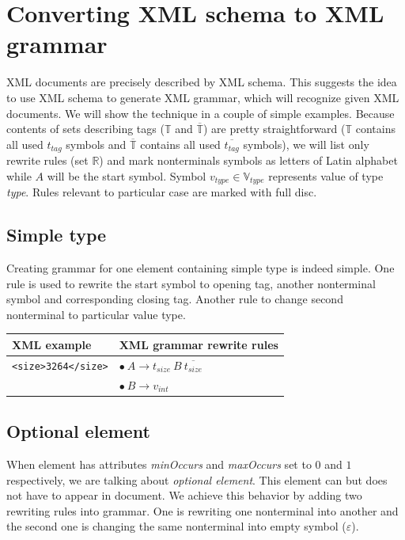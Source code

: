 \documentclass[12pt,notitlepage]{report}
\begin{document}
\section{Converting XML schema to XML grammar}
\label{convert-xml-grammar}

XML documents are precisely described by XML schema. This suggests the idea to use XML schema to generate XML grammar, which will recognize given XML documents. We will show the technique in a couple of simple examples. Because contents of sets describing tags ($\mathbb{T}$ and $\overline{\mathbb{T}}$) are pretty straightforward ($\mathbb{T}$ contains all used $t_{tag}$ symbols and $\overline{\mathbb{T}}$ contains all used $\overline{t_{tag}}$ symbols), we will list only rewrite rules (set $\mathbb{R}$) and mark nonterminals symbols as letters of Latin alphabet while $A$ will be the start symbol. Symbol $v_{type} \in \mathbb{V}_{type}$ represents value of type \textit{type}. Rules relevant to particular case are marked with full disc.

\subsection{Simple type}

Creating grammar for one element containing simple type is indeed simple. One rule is used to rewrite the start symbol to opening tag, another nonterminal symbol and corresponding closing tag. Another rule to change second nonterminal to particular value type.

\begin{center}
\setlength{\tabcolsep}{0.5cm}
\renewcommand{\arraystretch}{1.3}
\begin{tabular}{|l|l|}
\hline
XML example & XML grammar rewrite rules \\ \hline
\texttt{<size>3264</size>} & $\bullet~A \rightarrow t_{size}~B~\overline{t_{size}}$ \\
 & $\bullet~B \rightarrow v_{int}$ \\ \hline
\end{tabular}
\end{center}

\subsection{Optional element}

When element has attributes \textit{minOccurs} and \textit{maxOccurs} set to $0$ and $1$ respectively, we are talking about \textit{optional element}. This element can but does not have to appear in document. We achieve this behavior by adding two rewriting rules into grammar. One is rewriting one nonterminal into another and the second one is changing the same nonterminal into empty symbol ($\varepsilon$).
\end{document}
